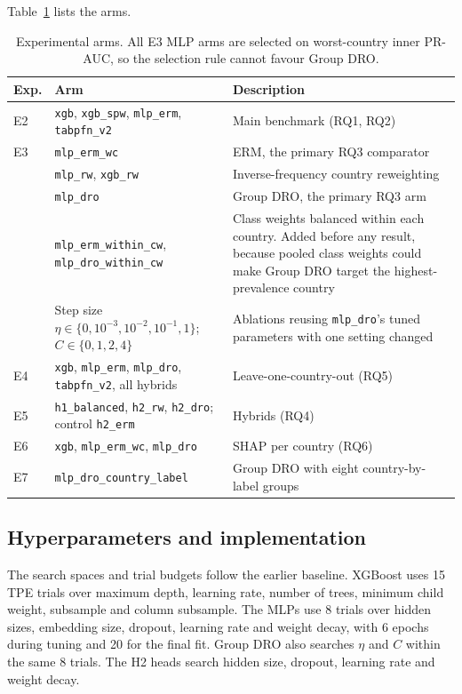 \documentclass[11pt]{article}
\newcommand{\arm}[1]{\texttt{#1}}
\begin{document}
Table~\ref{tab:arms} lists the arms.

\begin{table}[H]
  \centering
  \small
  \caption{Experimental arms. All E3 MLP arms are selected on worst-country inner PR-AUC, so the selection rule cannot favour Group DRO.}
  \label{tab:arms}
  \begin{tabular}{p{}p{}p{}}
    \toprule
    Exp. & Arm & Description \\
    \midrule
    E2 & \arm{xgb}, \arm{xgb\_spw}, \arm{mlp\_erm}, \arm{tabpfn\_v2} & Main benchmark (RQ1, RQ2) \\
    E3 & \arm{mlp\_erm\_wc} & ERM, the primary RQ3 comparator \\
       & \arm{mlp\_rw}, \arm{xgb\_rw} & Inverse-frequency country reweighting \\
       & \arm{mlp\_dro} & Group DRO, the primary RQ3 arm \\
       & \arm{mlp\_erm\_within\_cw}, \arm{mlp\_dro\_within\_cw} & Class weights balanced within each country. Added before any result, because pooled class weights could make Group DRO target the highest-prevalence country \\
       & Step size $\eta \in \{0, 10^{-3}, 10^{-2}, 10^{-1}, 1\}$; $C \in \{0,1,2,4\}$ & Ablations reusing \arm{mlp\_dro}'s tuned parameters with one setting changed \\
    E4 & \arm{xgb}, \arm{mlp\_erm}, \arm{mlp\_dro}, \arm{tabpfn\_v2}, all hybrids & Leave-one-country-out (RQ5) \\
    E5 & \arm{h1\_balanced}, \arm{h2\_rw}, \arm{h2\_dro}; control \arm{h2\_erm} & Hybrids (RQ4) \\
    E6 & \arm{xgb}, \arm{mlp\_erm\_wc}, \arm{mlp\_dro} & SHAP per country (RQ6) \\
    E7 & \arm{mlp\_dro\_country\_label} & Group DRO with eight country-by-label groups \\
    \bottomrule
  \end{tabular}
\end{table}

\subsection{Hyperparameters and implementation}

The search spaces and trial budgets follow the earlier baseline. XGBoost uses 15 TPE trials over maximum depth, learning rate, number of trees, minimum child weight, subsample and column subsample. The MLPs use 8 trials over hidden sizes, embedding size, dropout, learning rate and weight decay, with 6 epochs during tuning and 20 for the final fit. Group DRO also searches $\eta$ and $C$ within the same 8 trials. The H2 heads search hidden size, dropout, learning rate and weight decay.
\end{document}
